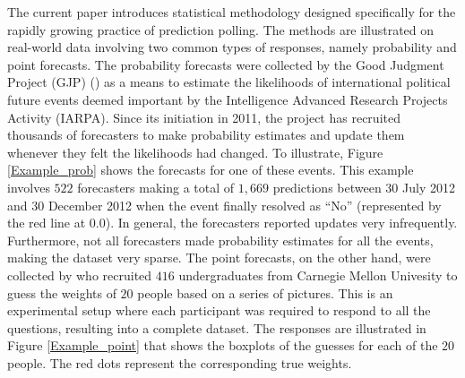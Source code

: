 \documentclass[11pt]{article}
\theoremstyle{definition}
\theoremstyle{definition}
\begin{document}
The current paper introduces statistical methodology designed specifically for the rapidly growing practice of prediction polling. The methods are illustrated on real-world data involving two common types of responses, namely probability and point forecasts. The probability forecasts were collected 
by the Good Judgment Project (GJP) (\citealt{ungar2012good, mellers2014psychological}) as a means to estimate the likelihoods of international political future events deemed important by the Intelligence Advanced Research Projects Activity (IARPA). 
Since its initiation in 2011, the project has recruited thousands of forecasters to make probability estimates and update them whenever they felt the likelihoods had changed. To illustrate, Figure \ref{Example_prob} shows the forecasts for one of these events. This example involves $522$ forecasters making a total of $1,669$ predictions between 30 July 2012 and 30 December 2012 when the event finally resolved as ``No'' (represented by the red line at $0.0$). 
In general, the forecasters reported updates very infrequently. Furthermore, not all forecasters made probability estimates for all the events, making the dataset very sparse. The point forecasts, on the other hand, were collected by \cite{moore2008use} who recruited $416$ undergraduates from Carnegie Mellon Univesity to guess the weights of $20$ people based on a series of pictures. This is an experimental setup where each participant was required to respond to all the questions, resulting into a complete dataset. The responses are illustrated in Figure \ref{Example_point} that shows the boxplots of the guesses for each of the $20$ people. The red dots represent the corresponding true weights.
\end{document}
